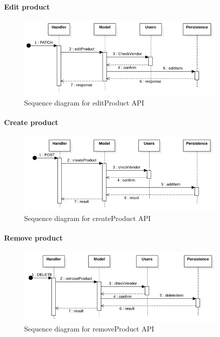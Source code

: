 \paragraph*{Edit product}
\begin{figure}[H]
    \includegraphics[width=0.9\textwidth]{res/images/sequence-diagrams/products/editProduct.png}
    \caption{Sequence diagram for editProduct API}
\end{figure}

\paragraph*{Create product}
\begin{figure}[H]
    \includegraphics[width=0.9\textwidth]{res/images/sequence-diagrams/products/createProduct.png}
    \caption{Sequence diagram for createProduct API}
\end{figure}

\paragraph*{Remove product}
\begin{figure}[H]
    \includegraphics[width=0.9\textwidth]{res/images/sequence-diagrams/products/removeProduct.png}
    \caption{Sequence diagram for removeProduct API}
\end{figure}


